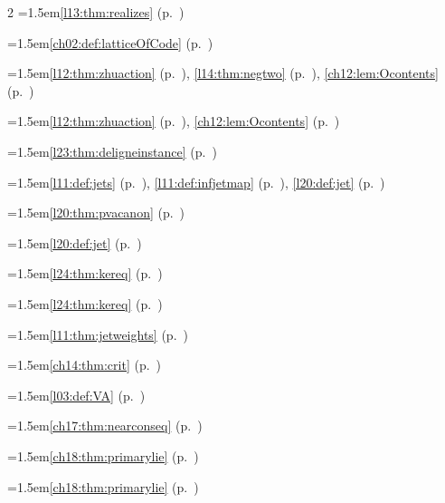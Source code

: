 \begin{multicols}{2}
\hangindent=1.5em\quad \ref{l13:thm:realizes} (p.~\pageref{l13:thm:realizes})\par
\hangindent=1.5em\quad \ref{ch02:def:latticeOfCode} (p.~\pageref{ch02:def:latticeOfCode})\par
\hangindent=1.5em\quad \ref{l12:thm:zhuaction} (p.~\pageref{l12:thm:zhuaction}), \ref{l14:thm:negtwo} (p.~\pageref{l14:thm:negtwo}), \ref{ch12:lem:Ocontents} (p.~\pageref{ch12:lem:Ocontents})\par
\hangindent=1.5em\quad \ref{l12:thm:zhuaction} (p.~\pageref{l12:thm:zhuaction}), \ref{ch12:lem:Ocontents} (p.~\pageref{ch12:lem:Ocontents})\par
\hangindent=1.5em\quad \ref{l23:thm:deligneinstance} (p.~\pageref{l23:thm:deligneinstance})\par
\hangindent=1.5em\quad \ref{l11:def:jets} (p.~\pageref{l11:def:jets}), \ref{l11:def:infjetmap} (p.~\pageref{l11:def:infjetmap}), \ref{l20:def:jet} (p.~\pageref{l20:def:jet})\par
\hangindent=1.5em\quad \ref{l20:thm:pvacanon} (p.~\pageref{l20:thm:pvacanon})\par
\hangindent=1.5em\quad \ref{l20:def:jet} (p.~\pageref{l20:def:jet})\par
\hangindent=1.5em\quad \ref{l24:thm:kereq} (p.~\pageref{l24:thm:kereq})\par
\hangindent=1.5em\quad \ref{l24:thm:kereq} (p.~\pageref{l24:thm:kereq})\par
\hangindent=1.5em\quad \ref{l11:thm:jetweights} (p.~\pageref{l11:thm:jetweights})\par
\hangindent=1.5em\quad \ref{ch14:thm:crit} (p.~\pageref{ch14:thm:crit})\par
\hangindent=1.5em\quad \ref{l03:def:VA} (p.~\pageref{l03:def:VA})\par
\hangindent=1.5em\quad \ref{ch17:thm:nearconseq} (p.~\pageref{ch17:thm:nearconseq})\par
\hangindent=1.5em\quad \ref{ch18:thm:primarylie} (p.~\pageref{ch18:thm:primarylie})\par
\hangindent=1.5em\quad \ref{ch18:thm:primarylie} (p.~\pageref{ch18:thm:primarylie})\par

\end{multicols}
